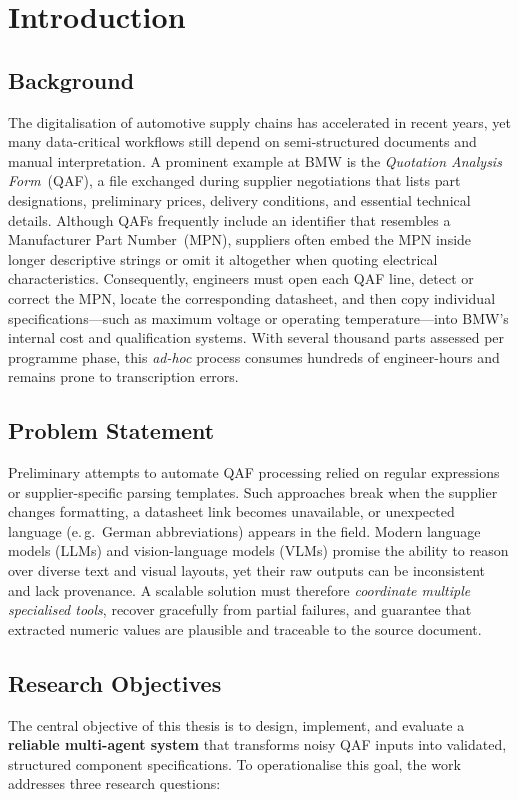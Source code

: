 \chapter{Introduction}\label{chapter:introduction}

\section{Background}
The digitalisation of automotive supply chains has accelerated in recent years, yet many data-critical workflows still depend on semi-structured documents and manual interpretation.  
A prominent example at BMW is the \emph{Quotation Analysis Form}~(QAF), a file exchanged during supplier negotiations that lists part designations, preliminary prices, delivery conditions, and essential technical details.  
Although QAFs frequently include an identifier that resembles a Manufacturer Part Number~(MPN), suppliers often embed the MPN inside longer descriptive strings or omit it altogether when quoting electrical characteristics.  
Consequently, engineers must open each QAF line, detect or correct the MPN, locate the corresponding datasheet, and then copy individual specifications—such as maximum voltage or operating temperature—into BMW’s internal cost and qualification systems.  
With several thousand parts assessed per programme phase, this \emph{ad-hoc} process consumes hundreds of engineer-hours and remains prone to transcription errors.

\section{Problem Statement}
Preliminary attempts to automate QAF processing relied on regular expressions or supplier-specific parsing templates.  
Such approaches break when the supplier changes formatting, a datasheet link becomes unavailable, or unexpected language (e.\,g.\ German abbreviations) appears in the field.  
Modern language models (LLMs) and vision-language models (VLMs) promise the ability to reason over diverse text and visual layouts, yet their raw outputs can be inconsistent and lack provenance.  
A scalable solution must therefore \emph{coordinate multiple specialised tools}, recover gracefully from partial failures, and guarantee that extracted numeric values are plausible and traceable to the source document.

\section{Research Objectives}
The central objective of this thesis is to design, implement, and evaluate a \textbf{reliable multi-agent system} that transforms noisy QAF inputs into validated, structured component specifications.  
To operationalise this goal, the work addresses three research questions:

